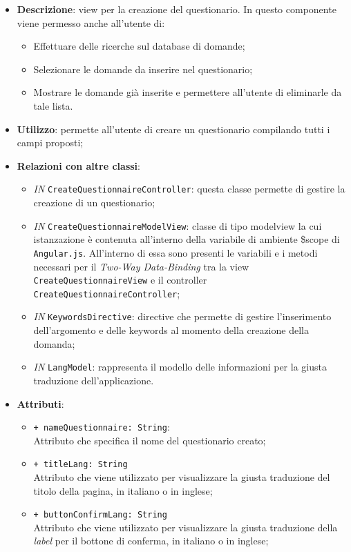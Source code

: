 \begin{itemize}
	\item \textbf{Descrizione}: view per la creazione del questionario. In questo componente viene permesso anche all'utente di:
	\begin{itemize}
		\item Effettuare delle ricerche sul database di domande;
		\item Selezionare le domande da inserire nel questionario;
		\item Mostrare le domande già inserite e permettere all'utente di eliminarle da tale lista.
	\end{itemize}
	\item \textbf{Utilizzo}: permette all'utente di creare un questionario compilando tutti i campi proposti;
	\item \textbf{Relazioni con altre classi}:
	\begin{itemize}
		\item \textit{IN} \texttt{CreateQuestionnaireController}:  questa classe permette di gestire la creazione di un questionario;
		\item \textit{IN} \texttt{CreateQuestionnaireModelView}: classe di tipo modelview la cui istanzazione è contenuta all'interno della variabile di ambiente \$scope di \texttt{Angular.js}. All'interno di essa sono presenti le variabili e i metodi necessari per il \textit{Two-Way Data-Binding} tra la view \texttt{CreateQuestionnaireView} e il controller \texttt{CreateQuestionnaireController};
		\item \textit{IN} \texttt{KeywordsDirective}: directive che permette di gestire l'inserimento dell'argomento e delle keywords al momento della creazione della domanda;
		\item \textit{IN} \texttt{LangModel}: rappresenta il modello delle informazioni per la giusta traduzione dell'applicazione.
	\end{itemize}
		\item \textbf{Attributi}:
		\begin{itemize}
			\item \texttt{+ nameQuestionnaire: String}: \\ Attributo che specifica il nome del questionario creato;
			\item \texttt{+ titleLang: String} \\ Attributo che viene utilizzato per visualizzare la giusta traduzione del titolo della pagina, in italiano o in inglese;
			\item \texttt{+ buttonConfirmLang: String} \\ Attributo che viene utilizzato per visualizzare la giusta traduzione della \textit{label} per il bottone di conferma, in italiano o in inglese;

\end{itemize}
\end{itemize}

